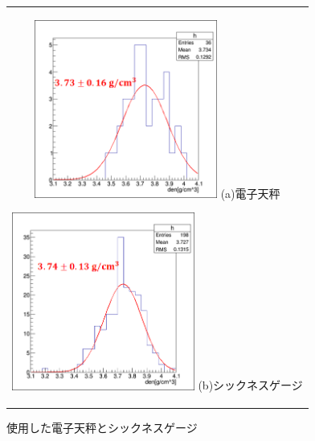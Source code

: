 \documentclass[12pt,a4paper]{jarticle}
\begin{document}
\begin{figure}[htbp]
    \begin{center}
      \begin{tabular}{c}
        \begin{minipage}{0.5\hsize}
          \begin{center}
            \includegraphics[clip, width=60mm]{1stRun_thin_den.png}
            \hspace{1.6cm} (a)電子天秤
          \end{center}
        \end{minipage}
        
        \begin{minipage}{0.5\hsize}
          \begin{center}
            \includegraphics[clip, width=60mm]{2ndRun_thin_den.png}
            \hspace{1.6cm} (b)シックネスゲージ
          \end{center}
        \end{minipage}
    
      \end{tabular}
      \caption{使用した電子天秤とシックネスゲージ\label{fig:tennbinn_thicknessgage}}
    \end{center}
\end{figure}
\par
\end{document}
